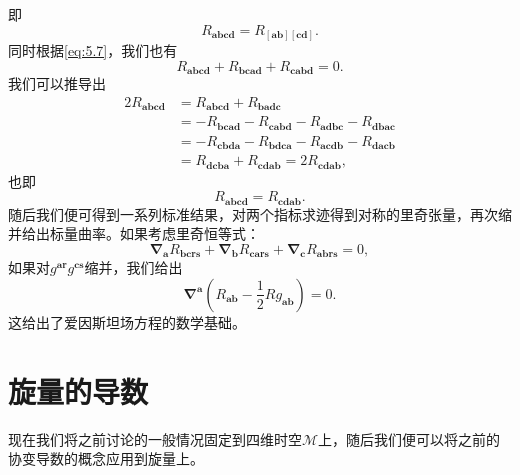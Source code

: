 即
\begin{equation*}
	R_{\boldsymbol{abcd}} =R_{[\boldsymbol{ab}][\boldsymbol{cd}]} .
\end{equation*}
同时根据\ref{eq:5.7}，我们也有
\begin{equation*}
	R_{\boldsymbol{abcd}} +R_{\boldsymbol{bcad}} +R_{\boldsymbol{cabd}} =0.
\end{equation*}
我们可以推导出
\begin{equation*}
	\begin{aligned}
		2R_{\boldsymbol{abcd}} & =R_{\boldsymbol{abcd}} +R_{\boldsymbol{badc}}\\
		& =-R_{\boldsymbol{bcad}} -R_{\boldsymbol{cabd}} -R_{\boldsymbol{adbc}} -R_{\boldsymbol{dbac}}\\
		& =-R_{\boldsymbol{cbda}} -R_{\boldsymbol{bdca}} -R_{\boldsymbol{acdb}} -R_{\boldsymbol{dacb}}\\
		& =R_{\boldsymbol{dcba}} +R_{\boldsymbol{cdab}} =2R_{\boldsymbol{cdab}} ,
	\end{aligned}
\end{equation*}
也即
\begin{equation*}
	R_{\boldsymbol{abcd}} =R_{\boldsymbol{cdab}} .
\end{equation*}
随后我们便可得到一系列标准结果，对两个指标求迹得到对称的里奇张量，再次缩并给出标量曲率。如果考虑里奇恒等式：
\begin{equation*}
	\boldsymbol{\nabla }_{\boldsymbol{a}} R_{\boldsymbol{bcrs}} +\boldsymbol{\nabla }_{\boldsymbol{b}} R_{\boldsymbol{cars}} +\boldsymbol{\nabla }_{\boldsymbol{c}} R_{\boldsymbol{abrs}} =0,
\end{equation*}
如果对$g^{\boldsymbol{ar}} g^{\boldsymbol{cs}}$缩并，我们给出
\begin{equation*}
	\boldsymbol{\nabla }^{\boldsymbol{a}}\left( R_{\boldsymbol{ab}} -\frac{1}{2} Rg_{\boldsymbol{ab}}\right) =0.
\end{equation*}
这给出了爱因斯坦场方程的数学基础。


\section{旋量的导数}

现在我们将之前讨论的一般情况固定到四维时空$\mathcal{M}$上，随后我们便可以将之前的协变导数的概念应用到旋量上。




